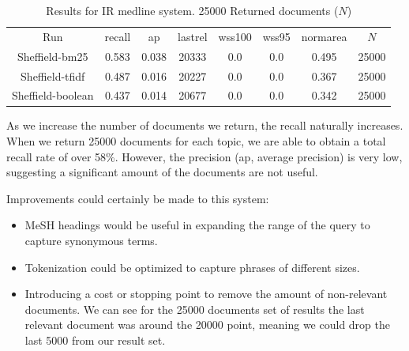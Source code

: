 \begin{table}[H]
\centering
\begin{tabular}{|c|c|c|c|c|c|c|c|} 
 \hline
 Run & recall &  ap & lastrel & wss100 & wss95 & normarea & $N$ \\ 
  Sheffield-bm25 & 0.583 &0.038 & 20333 &0.0 &0.0 & 0.495 & 25000 \\
  Sheffield-tfidf & 0.487 &0.016 & 20227 &0.0 &0.0 & 0.367 & 25000 \\
  Sheffield-boolean & 0.437 &0.014 & 20677 &0.0 &0.0 & 0.342 & 25000 \\
 \hline
\end{tabular}
\caption{Results for IR medline system. 25000 Returned documents ($N$) }
\end{table}


As we increase the number of documents we return, the recall naturally increases. When we return 25000 documents for each topic, we are able to obtain a total recall rate of over 58\%. However, the precision (ap, average precision) is very low, suggesting a significant amount of the documents are not useful.

Improvements could certainly be made to this system:

\begin{itemize}
  \item MeSH headings would be useful in expanding the range of the query to capture synonymous terms. 
  \item Tokenization could be optimized to capture phrases of different sizes.
  \item Introducing a cost or stopping point to remove the amount of non-relevant documents. We can see for the 25000 documents set of results the last relevant document was around the 20000 point, meaning we could drop the last 5000 from our result set.
\end{itemize}






